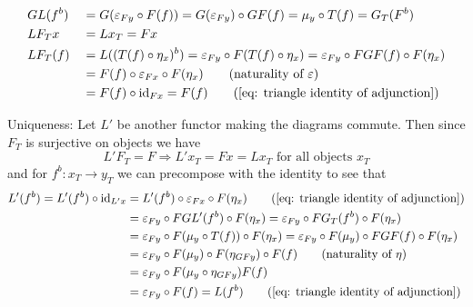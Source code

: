 \begin{beweis}
\begin{itemize1}
\begin{align*}
        &GL(f^b) &&= G(\eps_{Fy} \circ F(f)) = G(\eps_{Fy}) \circ GF(f) = \mu_y \circ T(f) = G_T(F^b) \\
        &LF_Tx &&= Lx_T = Fx \\
        &LF_T(f) &&= L((T(f) \circ \eta_x)^b) 
        = \eps_{Fy} \circ F(T(f) \circ \eta_x) = \eps_{Fy} \circ FGF(f) \circ F(\eta_x) \\
        &&&= F(f) \circ \eps_{Fx} \circ F(\eta_x) \tag{naturality of $\eps$} \\
        &&&= F(f) \circ \id_{Fx} = F(f) \tag{\ref{eq: triangle identity of adjunction}}
    \end{align*}
    \item Uniqueness: Let $L'$ be another functor making the diagrams commute.
    Then since $F_T$ is surjective on objects we have
    \[
        L'F_T = F \Rightarrow L'x_T = Fx = Lx_T \text{ for all objects } x_T
    \]
    and for $f^b \colon x_T \to y_T$ we can precompose with the identity to see that 
    \begin{align*}
        L'(f^b) = L'(f^b) \circ \id_{L'x} &= L'(f^b) \circ \eps_{Fx} \circ F(\eta_x) \tag{\ref{eq: triangle identity of adjunction}} \\
        &= \eps_{Fy} \circ FGL'(f^b) \circ F(\eta_x) 
        = \eps_{Fy} \circ FG_T(f^b) \circ F(\eta_x) \\
        &= \eps_{Fy} \circ F(\mu_y \circ T(f)) \circ F(\eta_x) 
        = \eps_{Fy} \circ F(\mu_y) \circ FGF(f) \circ F(\eta_x) \\
        &= \eps_{Fy} \circ F(\mu_y) \circ F(\eta_{GFy}) \circ F(f) \tag{naturality of $\eta$} \\
        &= \eps_{Fy} \circ F(\mu_y \circ \eta_{GFy}) F(f) \\
        &= \eps_{Fy} \circ F(f) = L(f^b) \tag{\ref{eq: triangle identity of adjunction}}
    \end{align*}  
    \end{itemize1}
\end{beweis}
